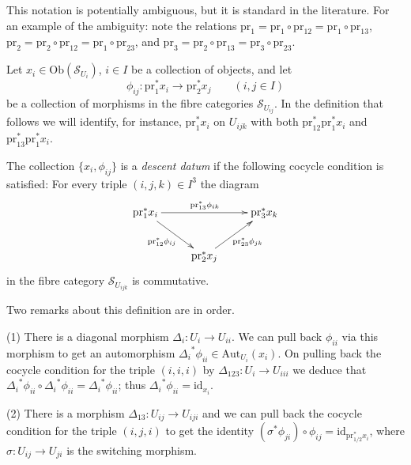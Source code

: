 \medskip\noindent
This notation is potentially ambiguous, but it is standard in the
literature. For an example of the ambiguity: note the relations
$\text{pr}_1 = \text{pr}_{1} \circ \text{pr}_{12} =
\text{pr}_1 \circ \text{pr}_{13}$, $\text{pr}_2 =
\text{pr}_2 \circ \text{pr}_{12} = \text{pr}_1 \circ \text{pr}_{23}$,
and $\text{pr}_3 = \text{pr}_2 \circ \text{pr}_{13} =
\text{pr}_3 \circ \text{pr}_{23}$.

\medskip\noindent
Let $x_i \in \text{Ob}(\mathcal{S}_{U_i})$, $i\in I$ be a collection of
objects, and let
$$
\phi_{ij} : \text{pr}_{1}^\ast x_i \longrightarrow
\text{pr}_{2}^\ast x_j \qquad (i,j \in I)
$$
be a collection of morphisms in the fibre categories
$\mathcal{S}_{U_{ij}}$. In the definition that follows we will
identify, for instance, $\text{pr}_1^\ast x_i$ on $U_{ijk}$ with both 
$\text{pr}_{12}^\ast \text{pr}_{1}^\ast x_i$ and 
$\text{pr}_{13}^\ast \text{pr}_{1}^\ast x_i$.

\begin{definition}
\label{definition-descent-data}
The collection $\{x_i, \phi_{ij}\}$ is a {\it descent datum} if
the following cocycle condition is satisfied: For every
triple $(i,j,k)\in I^3$ the diagram
$$
\xymatrix{
\text{pr}_1^\ast x_i 
	\ar[rr]^{\text{pr}_{13}^\ast \phi_{ik}}
	\ar[rd]_{\text{pr}_{12}^\ast \phi_{ij}}
& & 
\text{pr}_3^\ast x_k \\
& \text{pr}_2^\ast x_j \ar[ru]_{\text{pr}_{23}^\ast \phi_{jk}}
}
$$
in the fibre category $\mathcal{S}_{U_{ijk}}$ is commutative.
\end{definition}

\begin{remarks}
\label{remarks-definition-descent-datum}
Two remarks about this definition are in order.  

\medskip\noindent
(1) There is a diagonal morphism $\Delta_i : U_i \to U_{ii}$. We can pull back
$\phi_{ii}$ via this morphism to get an automorphism 
${\Delta_i}^\ast \phi_{ii} \in \text{Aut}_{U_i}(x_i)$.
On pulling back the cocycle condition for the triple $(i,i,i)$ 
by $\Delta_{123} : U_i \to U_{iii}$ we deduce that
${\Delta_i}^\ast \phi_{ii} \circ {\Delta_i}^\ast \phi_{ii} =
{\Delta_i}^\ast \phi_{ii}$; thus ${\Delta_i}^\ast \phi_{ii} =
\text{id}_{x_i}$.

\medskip\noindent
(2) There is a morphism
$\Delta_{13}: U_{ij} \to U_{iji}$ and we can pull back the
cocycle condition for the triple $(i,j,i)$ to get the
identity $(\sigma^\ast \phi_{ji}) \circ \phi_{ij} = 
\text{id}_{\text{pr}_{1/2}^\ast x_i}$, where $\sigma: U_{ij} \to U_{ji}$ is the
switching morphism.
\end{remarks}


